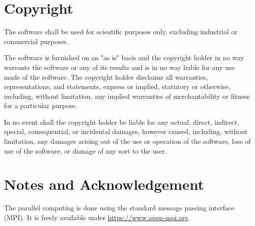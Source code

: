 \documentclass[a4paper,
                          headsepline,
                          listof=totoc,
                          toc=listof,
                          headings=small]{scrreprt} %
\begin{document}
\chapter{Copyright}

The software shall be used for scientific purposes only, excluding industrial or commercial purposes.

The software is furnished on an "as is" basis and the copyright holder in no way warrants
the software or any of its results and is in no way liable for any use made of the software.
The copyright holder disclaims all warranties, representations, and statements, express or implied, statutory or otherwise, including, without limitation, any implied warranties of
merchantability or fitness for a particular purpose.

In no event shall the copyright holder be liable for any actual, direct, indirect, special, consequential, or incidental damages, however caused, including, without limitation, any damages arising out of the use or operation of the software, loss of use of the software, or damage of any sort to the user.


\chapter{Notes and Acknowledgement}

The parallel computing is done using the standard message passing interface (MPI).
It is freely available under \href{https://www.open-mpi.org}{https://www.open-mpi.org}.


\end{document}
